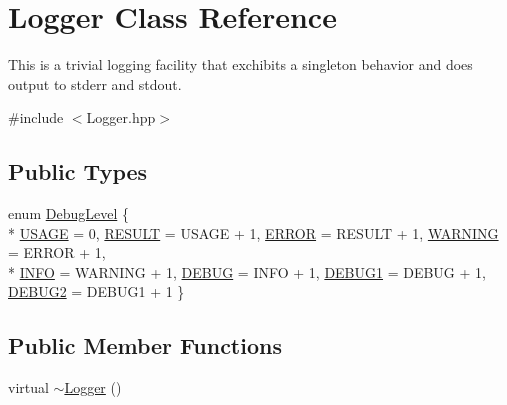 \hypertarget{class_logger}{}\section{Logger Class Reference}
\label{class_logger}


This is a trivial logging facility that exchibits a singleton behavior and does output to stderr and stdout.  




{\ttfamily \#include $<$Logger.\+hpp$>$}

\subsection*{Public Types}
\begin{DoxyCompactItemize}
\item 
enum \hyperlink{class_logger_a96ecc57d01700c7b14d101f0f65a9932}{Debug\+Level} \{ \\*
\hyperlink{class_logger_a96ecc57d01700c7b14d101f0f65a9932a83b5b4f40d4be307f9f26550c91cf3d5}{U\+S\+A\+G\+E} = 0, 
\hyperlink{class_logger_a96ecc57d01700c7b14d101f0f65a9932af5da0215b58667cc5314fc1bdc7a81e3}{R\+E\+S\+U\+L\+T} = U\+S\+A\+G\+E + 1, 
\hyperlink{class_logger_a96ecc57d01700c7b14d101f0f65a9932a3ce1bbeb15a3d8e29e4c5e75492a781b}{E\+R\+R\+O\+R} = R\+E\+S\+U\+L\+T + 1, 
\hyperlink{class_logger_a96ecc57d01700c7b14d101f0f65a9932afb1bf96f41b282521d9438106ea11bca}{W\+A\+R\+N\+I\+N\+G} = E\+R\+R\+O\+R + 1, 
\\*
\hyperlink{class_logger_a96ecc57d01700c7b14d101f0f65a9932a61a9b6fc1e9babc448984b8a34ca2ed2}{I\+N\+F\+O} = W\+A\+R\+N\+I\+N\+G + 1, 
\hyperlink{class_logger_a96ecc57d01700c7b14d101f0f65a9932abdc8d840ac4b73e1bd3212184af8f85e}{D\+E\+B\+U\+G} = I\+N\+F\+O + 1, 
\hyperlink{class_logger_a96ecc57d01700c7b14d101f0f65a9932a5f7718483e39a028518b90f969b41771}{D\+E\+B\+U\+G1} = D\+E\+B\+U\+G + 1, 
\hyperlink{class_logger_a96ecc57d01700c7b14d101f0f65a9932a616a45f059b15bff1cda9207cd465564}{D\+E\+B\+U\+G2} = D\+E\+B\+U\+G1 + 1
 \}
\end{DoxyCompactItemize}
\subsection*{Public Member Functions}
\begin{DoxyCompactItemize}
\item 
virtual \hyperlink{class_logger_ae93f62ca3e47716b7120acb032a260f3}{$\sim$\+Logger} ()
\end{DoxyCompactItemize}
